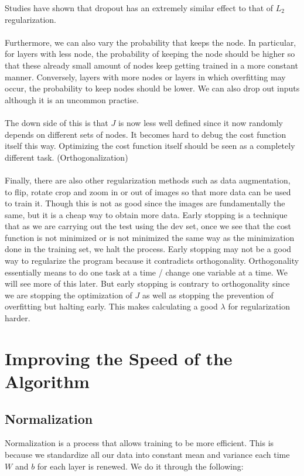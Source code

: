 \documentclass[a4paper]{article}
\begin{document}
Studies have shown that dropout has an extremely similar effect to that of $L_2$ regularization. \\~\\
Furthermore, we can also vary the probability that keeps the node. In particular, for layers with less node, the probability of keeping the node should be higher so that these already small amount of nodes keep getting trained in a more constant manner. Conversely, layers with more nodes or layers in which overfitting may occur, the probability to keep nodes should be lower. We can also drop out inputs although it is an uncommon practise. \\~\\
The down side of this is that $J$ is now less well defined since it now randomly depends on different sets of nodes. It becomes hard to debug the cost function itself this way. Optimizing the cost function itself should be seen as a completely different task. (Orthogonalization)\\~\\
Finally, there are also other regularization methods such as data augmentation, to flip, rotate crop and zoom in or out of images so that more data can be used to train it. Though this is not as good since the images are fundamentally the same, but it is a cheap way to obtain more data. Early stopping is a technique that as we are carrying out the test using the dev set, once we see that the cost function is not minimized or is not minimized the same way as the minimization done in the training set, we halt the process. 
Early stopping may not be a good way to regularize the program because it contradicts orthogonality. Orthogonality essentially means to do one task at a time / change one variable at a time. We will see more of this later. But early stopping is contrary to orthogonality since we are stopping the optimization of $J$ as well as stopping the prevention of overfitting but halting early. This makes calculating a good $\lambda$ for regularization harder. 

\pagebreak
\section{Improving the Speed of the Algorithm}
\subsection{Normalization}
Normalization is a process that allows training to be more efficient. This is because we standardize all our data into constant mean and variance each time $W$ and $b$ for each layer is renewed. We do it through the following: 
\end{document}
